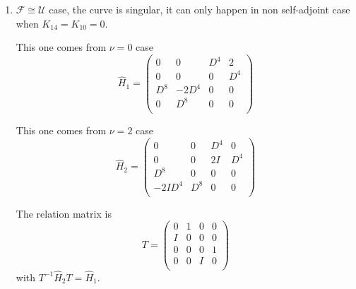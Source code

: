 \documentclass[11pt]{article}
\theoremstyle{definition}
\theoremstyle{plain}
\numberwithin{equation}{section}
\begin{document}
\begin{enumerate}
	In non self-adjoint case, since $K_{14}=3K_{12}^2+K_{10}K_{11}=0$ but $K_{10}\neq 0$, so that $K_{12}\neq 0$, we have 
	$$
	T_2=\left(
	\begin{array}{cccc}
		\frac{\left(\frac{1}{4}+\frac{I}{4}\right) K_{12}}{\sqrt{2}} & -\frac{1-I}{\sqrt{2}} & 0 & 0 \\
		0 & -\frac{(2-2 I) \sqrt{2}}{K_{12}} & 0 & 0 \\
		0 & 0 & \frac{\left(\frac{1}{4}+\frac{I}{4}\right) K_{12}}{\sqrt{2}} & -\frac{1-I}{\sqrt{2}} \\
		0 & 0 & 0 & -\frac{(2-2 I) \sqrt{2}}{K_{12}} \\
	\end{array}
	\right)
	$$
	with $T_2^{-1}\hat{H}_4T_2=\hat{H}_3$.
	\item $\mathcal{F}\cong\mathcal{U}$ case, the curve is singular, it can only happen in non self-adjoint case when $K_{14}=K_{10}=0$.
	
	This one comes from $\nu=0$ case
	$$
	\hat{H}_1=\left(
	\begin{array}{cccc}
		0 & 0 & D^4 & 2 \\
		0 & 0 & 0 & D^4 \\
		D^8 & -2 D^4 & 0 & 0 \\
		0 & D^8 & 0 & 0 \\
	\end{array}
	\right)
	$$
	
	This one comes from $\nu=2$ case
	$$
	\hat{H}_2=\left(
	\begin{array}{cccc}
		0 & 0 & D^4 & 0 \\
		0 & 0 & 2 I & D^4 \\
		D^8 & 0 & 0 & 0 \\
		-2 I D^4 & D^8 & 0 & 0 \\
	\end{array}
	\right)
	$$
	
	The relation matrix is 
	$$
	T=\left(
	\begin{array}{cccc}
		0 & 1 & 0 & 0 \\
		I & 0 & 0 & 0 \\
		0 & 0 & 0 & 1 \\
		0 & 0 & I & 0 \\
	\end{array}
	\right)
	$$
	with $T^{-1}\hat{H}_2T=\hat{H}_1$.
\end{enumerate}
\end{document}
